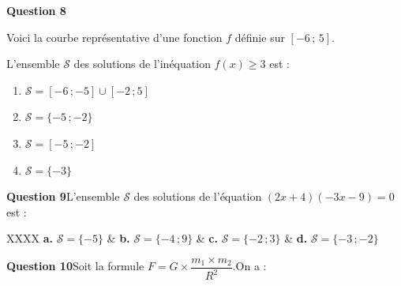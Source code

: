 \documentclass[10pt]{article}
\begin{document}
	\medskip
	
	\begin{minipage}{0.5\linewidth}
		\textbf{Question 8}
		
		Voici la courbe représentative d'une fonction $f$ définie sur $[-6\,;\,5]$.
		
		L'ensemble $\mathcal{S}$ des solutions de l'inéquation \quad $f(x)\geqslant 3$ \quad est :
		
		\begin{enumerate}[label=\textbf{\alph*.},leftmargin=*]
			\item $\mathcal{S}=[-6\,;-5]\cup[-2\,;5]$
			\item $\mathcal{S}=\{-5\,;-2\}$
			\item $\mathcal{S}=[-5\,;-2]$
			\item $\mathcal{S}=\{-3\}$
		\end{enumerate}
	\end{minipage}
	\hfill
	\begin{minipage}{0.46\linewidth}
		\begin{center}
		\end{center}
	\end{minipage}
	
	\medskip
	
	\textbf{Question 9}\quad L'ensemble $\mathcal{S}$ des solutions de l'équation \quad $(2x+4)(-3x-9)=0$ \quad est :
	
	\begin{tblr}{XXXX}
		\textbf{a.} $\mathcal{S}=\{-5\}$ & \textbf{b.} $\mathcal{S}=\{-4\,;9\}$ & \textbf{c.} $\mathcal{S}=\{-2\,;3\}$ & \textbf{d.} $\mathcal{S}=\{-3\,;-2\}$ \\
	\end{tblr}
	
	\medskip
	
	\textbf{Question 10}\quad Soit la formule \quad $F=G\times\dfrac{m_{1}\times m_{2}}{R^{2}}$.\quad On a :
	
\end{document}
